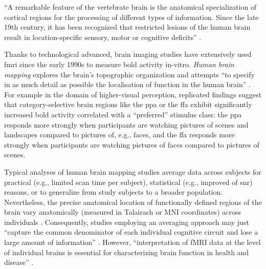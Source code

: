 
%
``A remarkable feature of the vertebrate brain is the anatomical specialization
of cortical regions for the processing of different types of information. Since
the late 19th century, it has been recognized that restricted lesions of the
human brain result in location-specific sensory, motor or cognitive deficits''
\citep{cohen1994localization}.




%
Thanks to technological advanced, brain imaging studies have extensively used
\ac{fmri} since the early 1990s to measure \ac{bold} activity in-vitro.
%
\textit{Human brain mapping} \citep[e.g.,][]{raichle2009brief} explores the
brain's topographic organization \citep[e.g.,][]{eickhoff2018topographic} and
attempts ``to specify in as much detail as possible the localisation of function
in the human brain'' \citep{savoy2001history}.
For example in the domain of higher-visual perception, replicated findings
suggest that category-selective brain regions like the \ac{ppa}
\citep{epstein1998ppa, epstein1999parahippocampal} or the \ac{ffa}
\citep{kanwisher1997ffa, kanwisher2006fusiform} exhibit significantly increased
\ac{bold} activity correlated with a ``preferred'' stimulus class: the \ac{ppa}
responds more strongly when participants are watching pictures of scenes and
landscapes compared to pictures of, e.g., faces, and the \ac{ffa} responds more
strongly when participants are watching pictures of faces compared to pictures
of scenes.

%
Typical analyses of human brain mapping studies average data across subjects for
practical (e.g., limited scan time per subject), statistical (e.g., improved
of \ac{snr}) reasons, or to generalize from study subjects to a broader
population.
%
Nevertheless, the precise anatomical location of functionally defined regions of
the brain vary anatomically (measured in Talairach or MNI coordinates) across
individuals \citep{friston2006critique, saxe2006divide}.
%
Consequently, studies employing an averaging approach may just ``capture the
common denominator of each individual cognitive circuit and lose a large amount
of information'' \citep{pinel2007fast}.
%
However, ``interpretation of fMRI data at the level of individual brains is
essential for characterizing brain function in health and disease''
\citep{dubois2016building}.


